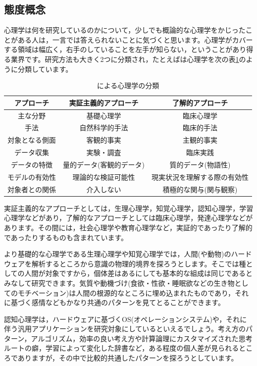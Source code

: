 \documentclass{ltjsbook}
\begin{document}
\subsection{態度概念}

心理学は何を研究しているのかについて，少しでも概論的な心理学をかじったことがある人は，一言では答えられないことに気づくと思います。心理学がカバーする領域は幅広く，右手のしていることを左手が知らない，ということがあり得る業界です。研究方法も大きく2つに分類され，たとえば\textcite{Shimoyama2001}は心理学を次の表\ref{tbl01_01}のように分類しています。

\begin{table}[ht]
	\centering
	\caption{\textcite{Shimoyama2001}による心理学の分類}
	\begin{tabular}{ccc}
		アプローチ   & 実証主義的アプローチ    & 了解的アプローチ       \\\hline
		主な分野    & 基礎心理学         & 臨床心理学          \\
		手法      & 自然科学的手法       & 臨床的手法          \\
		対象となる側面 & 客観的事実         & 主観的事実          \\
		データ収集   & 実験・調査         & 臨床実践           \\
		データの特徴  & 量的データ(客観的データ) & 質的データ(物語性)     \\
		モデルの有効性 & 理論的な検証可能性     & 現実状況を理解する際の有効性 \\
		対象者との関係 & 介入しない         & 積極的な関与(関与観察)   \\\hline
	\end{tabular}
	\label{tbl01_01}
\end{table}

実証主義的なアプローチとしては，生理心理学，知覚心理学，認知心理学，学習心理学などがあり，了解的なアプローチとしては臨床心理学，発達心理学などがあります。その間には，社会心理学や教育心理学など，実証的であったり了解的であったりするものも含まれています。

より基礎的な心理学である生理心理学や知覚心理学では，人間(や動物)のハードウェアを解析するところから意識の物理的境界を探ろうとします。そこでは種としての人間が対象ですから，個体差はあるにしても基本的な組成は同じであるとみなして研究できます。気質や動機づけ(食欲・性欲・睡眠欲などの生き物としてのモチベーション)は人間の根源的なところに埋め込まれたものであり，それに基づく感情などもかなり共通のパターンを見てとることができます。

認知心理学は，ハードウェアに基づくOS(オペレーションシステム)や，それに伴う汎用アプリケーションを研究対象にしているといえるでしょう。考え方のパターン，アルゴリズム，効率の良い考え方や計算論理にカスタマイズされた思考ルートの癖，学習によって変化した辞書など，ある程度の個人差が見られるところでありますが，その中で比較的共通したパターンを探ろうとしています。
\end{document}
